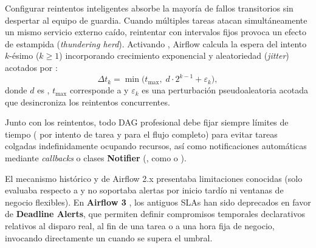 Configurar reintentos inteligentes absorbe la mayoría de fallos transitorios sin despertar al equipo de guardia. Cuando múltiples tareas atacan simultáneamente un mismo servicio externo caído, reintentar con intervalos fijos provoca un efecto de estampida (\textit{thundering herd}). Activando , Airflow calcula la espera del intento $k$-ésimo ($k \ge 1$) incorporando crecimiento exponencial y aleatoriedad (\textit{jitter}) acotados por :
\begin{equation}
  \Delta t_k = \min\!\Big(t_{\max},\; d \cdot 2^{k-1} + \varepsilon_k\Big),
  \label{eq:backoff}
\end{equation}
donde $d$ es , $t_{\max}$ corresponde a  y $\varepsilon_k$ es una perturbación pseudoaleatoria acotada que desincroniza los reintentos concurrentes.

Junto con los reintentos, todo DAG profesional debe fijar siempre límites de tiempo ( por intento de tarea y  para el flujo completo) para evitar tareas colgadas indefinidamente ocupando recursos, así como notificaciones automáticas mediante \textit{callbacks} o clases \textbf{Notifier} (, como  o ).

\begin{modernbox}
El mecanismo histórico  y  de Airflow 2.x presentaba limitaciones conocidas (solo evaluaba respecto a  y no soportaba alertas por inicio tardío ni ventanas de negocio flexibles). En \textbf{Airflow 3} , los antiguos SLAs han sido deprecados en favor de \textbf{Deadline Alerts}, que permiten definir compromisos temporales declarativos relativos al disparo real, al fin de una tarea o a una hora fija de negocio, invocando directamente un  cuando se supera el umbral.
\end{modernbox}

